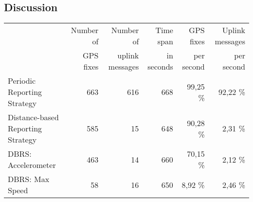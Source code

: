 \subsection{Discussion}

\begin{table*}[!h]
\begin{tabular}{lrrrrr}

& Number of & Number of & Time span & GPS fixes & Uplink messages \\

& GPS fixes & uplink messages & in seconds & per second & per second \\

\hline

Periodic Reporting Strategy & 663 & 616 & 668 & 99,25 \% & 92,22 \% \\

\hline

Distance-based Reporting Strategy & 585 & 15 & 648 & 90,28 \% & 2,31 \% \\

\hline

DBRS: Accelerometer & 463 & 14 & 660 & 70,15 \% & 2,12 \% \\

\hline

DBRS: Max Speed & 58 & 16 & 650 & 8,92 \% & 2,46 \% \\

\hline

\end{tabular}
\end{table*}